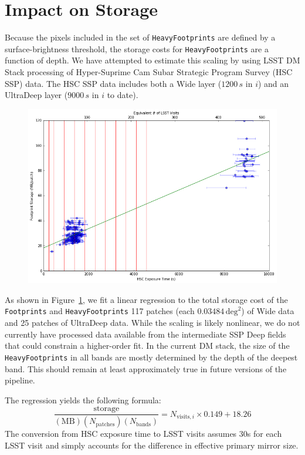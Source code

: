 \documentclass[DM,lsstdraft,toc]{lsstdoc}
\begin{document}
\section{Impact on Storage}

Because the pixels included in the set of \texttt{HeavyFootprints} are defined by a surface-brightness threshold, the storage costs for \texttt{HeavyFootprints} are a function of depth.  We have attempted to estimate this scaling by using LSST DM Stack processing of Hyper-Suprime Cam Subar Strategic Program Survey (HSC SSP) data.  The HSC SSP data includes both a Wide layer ($1200\,s$ in $i$) and an UltraDeep layer ($9000\,s$ in $i$ to date).

\begin{figure}
\includegraphics[width=\textwidth]{regression.png}
\label{fig:regression}
\end{figure}


As shown in Figure~\ref{fig:regression}, we fit a linear regression to the total storage cost of the \texttt{Footprints} and \texttt{HeavyFootprints} 117 patches (each $0.03484\,\mathrm{deg}^2$) of Wide data and 25 patches of UltraDeep data.  While the scaling is likely nonlinear, we do not currently have processed data available from the intermediate SSP Deep fields that could constrain a higher-order fit.  In the current DM stack, the size of the \texttt{HeavyFootprints} in all bands are mostly determined by the depth of the deepest band.  This should remain at least approximately true in future versions of the pipeline.

The regression yields the following formula:
$$
    \frac{\mathrm{storage}}{(\mathrm{MB})(N_\mathrm{patches})(N_\mathrm{bands})} =
        N_{\mathrm{visits},i} \times 0.149 + 18.26
$$
The conversion from HSC exposure time to LSST visits assumes 30s for each LSST visit and simply accounts for the difference in effective primary mirror size.
\end{document}
